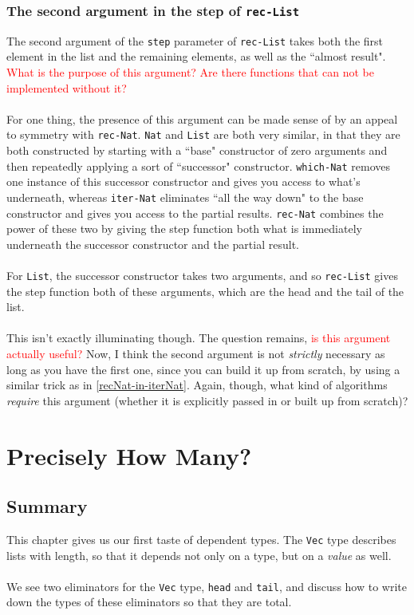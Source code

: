 \documentclass{article}
\newcommand{\ttt}[1]{\texttt{#1}}
\begin{document}
\subsubsection{The second argument in the step of \ttt{rec-List}}
The second argument of the \ttt{step} parameter of \ttt{rec-List} takes both the first element in the list and the remaining elements, as well as the ``almost result". \textcolor{red}{What is the purpose of this argument? Are there functions that can not be implemented without it?}
\\ \\
For one thing, the presence of this argument can be made sense of by an appeal to symmetry with \ttt{rec-Nat}. \ttt{Nat} and \ttt{List} are both very similar, in that they are both constructed by starting with a ``base" constructor of zero arguments and then repeatedly applying a sort of ``successor" constructor. \ttt{which-Nat} removes one instance of this successor constructor and gives you access to what's underneath, whereas \ttt{iter-Nat} eliminates ``all the way down" to the base constructor and gives you access to the partial results. \ttt{rec-Nat} combines the power of these two by giving the step function both what is immediately underneath the successor constructor and the partial result.
\\ \\
For \ttt{List}, the successor constructor takes two arguments, and so \ttt{rec-List} gives the step function both of these arguments, which are the head and the tail of the list.
\\ \\
This isn't exactly illuminating though. The question remains, \textcolor{red}{is this argument actually useful?} Now, I think the second argument is not \textit{strictly} necessary as long as you have the first one, since you can build it up from scratch, by using a similar trick as in \autoref{recNat-in-iterNat}. Again, though, what kind of algorithms \textit{require} this argument (whether it is explicitly passed in or built up from scratch)?
\section{Precisely How Many?}
\subsection{Summary}
This chapter gives us our first taste of dependent types. The \ttt{Vec} type describes lists with length, so that it depends not only on a type, but on a \textit{value} as well.
\\ \\
We see two eliminators for the \ttt{Vec} type, \ttt{head} and \ttt{tail}, and discuss how to write down the types of these eliminators so that they are total.
\end{document}
